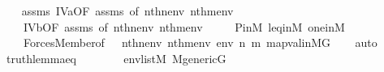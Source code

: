 \begin{isabellebody}
%
\isadelimproof
\ \ %
\endisadelimproof
%
\isatagproof
{}\isamarkupfalse%
\ assms\ IV{}{}{}a{\isacharbrackleft}{\kern0pt}OF\ assms{\isacharparenleft}{\kern0pt}{}{\isacharparenright}{\kern0pt}{\isacharcomma}{\kern0pt}\ of\ {\isachardoublequoteopen}nth{\isacharparenleft}{\kern0pt}n{\isacharcomma}{\kern0pt}env{\isacharparenright}{\kern0pt}{\isachardoublequoteclose}\ {\isachardoublequoteopen}nth{\isacharparenleft}{\kern0pt}m{\isacharcomma}{\kern0pt}env{\isacharparenright}{\kern0pt}{\isachardoublequoteclose}{\isacharbrackright}{\kern0pt}\ \isanewline
\ \ \ \ IV{}{}{}b{\isacharbrackleft}{\kern0pt}OF\ assms{\isacharparenleft}{\kern0pt}{}{\isacharparenright}{\kern0pt}{\isacharcomma}{\kern0pt}\ of\ {\isachardoublequoteopen}nth{\isacharparenleft}{\kern0pt}n{\isacharcomma}{\kern0pt}env{\isacharparenright}{\kern0pt}{\isachardoublequoteclose}\ {\isachardoublequoteopen}nth{\isacharparenleft}{\kern0pt}m{\isacharcomma}{\kern0pt}env{\isacharparenright}{\kern0pt}{\isachardoublequoteclose}{\isacharbrackright}{\kern0pt}\ \isanewline
\ \ \ \ P{\isacharunderscore}{\kern0pt}in{\isacharunderscore}{\kern0pt}M\ leq{\isacharunderscore}{\kern0pt}in{\isacharunderscore}{\kern0pt}M\ one{\isacharunderscore}{\kern0pt}in{\isacharunderscore}{\kern0pt}M\ \isanewline
\ \ \ \ Forces{\isacharunderscore}{\kern0pt}Member{\isacharbrackleft}{\kern0pt}of\ {\isacharunderscore}{\kern0pt}\ \ {\isachardoublequoteopen}nth{\isacharparenleft}{\kern0pt}n{\isacharcomma}{\kern0pt}env{\isacharparenright}{\kern0pt}{\isachardoublequoteclose}\ {\isachardoublequoteopen}nth{\isacharparenleft}{\kern0pt}m{\isacharcomma}{\kern0pt}env{\isacharparenright}{\kern0pt}{\isachardoublequoteclose}\ env\ n\ m{\isacharbrackright}{\kern0pt}\ map{\isacharunderscore}{\kern0pt}val{\isacharunderscore}{\kern0pt}in{\isacharunderscore}{\kern0pt}MG\isanewline
\ \ \isamarkupfalse%
\ {\isacharparenleft}{\kern0pt}auto{\isacharparenright}{\kern0pt}%
\endisatagproof
{\isafoldproof}%
%
\isadelimproof
\isanewline
%
\endisadelimproof
\isanewline
{}\isamarkupfalse%
\ truth{\isacharunderscore}{\kern0pt}lemma{\isacharunderscore}{\kern0pt}eq{\isacharcolon}{\kern0pt}\isanewline
\ \ \ \isanewline
\ \ \ \ {\isachardoublequoteopen}env{\isasymin}list{\isacharparenleft}{\kern0pt}M{\isacharparenright}{\kern0pt}{\isachardoublequoteclose}\ {\isachardoublequoteopen}M{\isacharunderscore}{\kern0pt}generic{\isacharparenleft}{\kern0pt}G{\isacharparenright}{\kern0pt}{\isachardoublequoteclose}\ \isanewline

\end{isabellebody}
